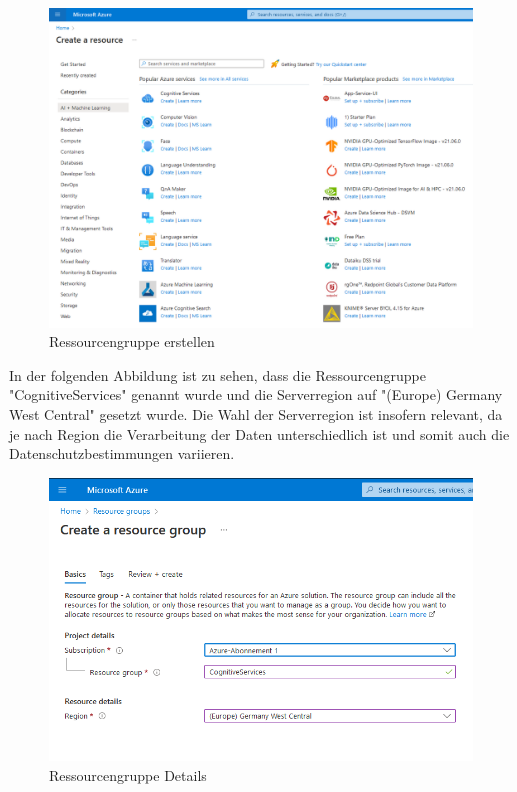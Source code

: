 \begin{figure}[h]
    \centering
    \includegraphics[scale=0.4]{sections/cloud-computing/images/ressourcengruppe.png}
    \caption{Ressourcengruppe erstellen}
    \label{fig:kimldl-comparison}
\end{figure}

\newpage In der folgenden Abbildung ist zu sehen, dass die Ressourcengruppe "CognitiveServices" genannt wurde und die Serverregion auf
"(Europe) Germany West Central" gesetzt wurde. Die Wahl der Serverregion ist insofern relevant, da je nach Region die Verarbeitung der 
Daten unterschiedlich ist und somit auch die Datenschutzbestimmungen variieren.

\begin{figure}[h]
    \centering
    \includegraphics[scale=0.6]{sections/cloud-computing/images/ressourcengruppe-erstellen.png}
    \caption{Ressourcengruppe Details}
    \label{fig:formrecognizer-ressourcegroup}
\end{figure}

